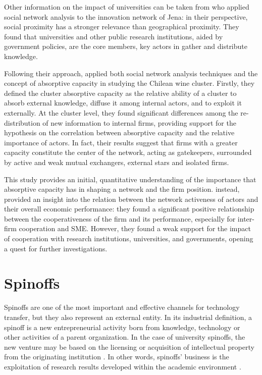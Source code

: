 Other information on the impact of universities can be taken from \citet{Cantner2006} who applied social network analysis to the innovation network of Jena: in their perspective, social proximity has a stronger relevance than geographical proximity. They found that universities and other public research institutions, aided by government policies, are the core members, key actors in gather and distribute knowledge.

Following their approach, \citet{Giuliani2005} applied both social network analysis techniques and the concept of absorptive capacity in studying the Chilean wine cluster. Firstly, they defined the cluster absorptive capacity as the relative ability of a cluster to absorb external knowledge, diffuse it among internal actors, and to exploit it externally. At the cluster level, they found significant differences among the re-distribution of new information to internal firms, providing support for the hypothesis on the correlation between absorptive capacity and the relative importance of actors. In fact, their results suggest that firms with a greater capacity constitute the center of the network, acting as gatekeepers, surrounded by active and weak mutual exchangers, external stars and isolated firms.

This study provides an initial, quantitative understanding of the importance that absorptive capacity has in shaping a network and the firm position. \citet{Zeng2010} instead, provided an insight into the relation between the network activeness of actors and their overall economic performance: they found a significant positive relationship between the cooperativeness of the firm and its performance, especially for inter-firm cooperation and SME. However, they found a weak support for the impact of cooperation with research institutions, universities, and governments, opening a quest for further investigations.


\section{Spinoffs}

Spinoffs are one of the most important and effective channels for technology transfer, but they also represent an external entity. In its industrial definition, a spinoff is a new entrepreneurial activity born from knowledge, technology or other activities of a parent organization. In the case of university spinoffs, the new venture may be based on the licensing or acquisition of intellectual property from the originating institution \citep{Lockett2005a}. In other words, spinoffs' business is the exploitation of research results developed within the academic environment \citep{Rizzo2015}.

